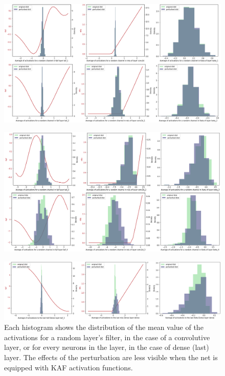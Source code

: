 \documentclass[LaM,binding=0.6cm]{./packages/sapthesis/sapthesis}
\begin{document}
        \begin{figure}[h!]
            \centering
            \includegraphics[width=1.1\textwidth]{actdist21.png}
            \label{fig:actdist21}
        \end{figure}
        \begin{figure}[h!]
            \centering
            \includegraphics[width=1.1\textwidth]{actdist22.png}
            \label{fig:actdist22}
        \end{figure}
        \begin{figure}[h!]
            \centering
            \includegraphics[width=1.1\textwidth]{actdist23.png}
            \caption{Each histogram shows the distribution of the mean value of the activations for a random layer's filter, in the case of a convolutive layer, or 
             for every neurons in the layer, in the case of dense (last) layer. The effects of the perturbation 
             are less visible when the net is equipped with KAF activation functions.}
            \label{fig:actdist23}
        \end{figure}
\end{document}
